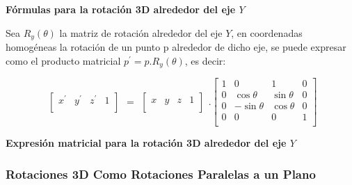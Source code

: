 \begin{center}
\textbf{\footnotesize{Fórmulas para la rotación 3D alrededor del eje $Y$}}
\end{center}


Sea $R_{y}( \theta )$ la matriz de rotación alrededor del eje $Y$, en coordenadas homogéneas la rotación de un punto p alrededor de dicho eje, se puede expresar como el producto matricial $p^{\prime} = p.R_{y}(\theta)$, es decir:

\begin{equation}
\begin{array}{rccl}
\left[
\begin{array}{rccl}
{x}^{\prime} & {y}^{\prime} & {z}^{\prime} & 1\\
\end{array}
\right]
\end{array}
=
\begin{array}{rccl}
\left[
\begin{array}{rccl}
x & y & z & 1\\
\end{array}
\right]
\end{array} 
.
\left[
\begin{array}{rccl}
1 & 0 & 1 & 0\\
0 & \cos\theta & \sin\theta &  0\\
0 & -\sin\theta & \cos\theta & 0 \\
0 & 0 & 0 & 1\\
\end{array}
\right]
\end{equation}

\begin{center}
\textbf{\footnotesize{Expresión matricial para la rotación 3D alrededor del eje $Y$}}
\end{center}

\subsubsection{Rotaciones 3D Como Rotaciones Paralelas a un Plano}

